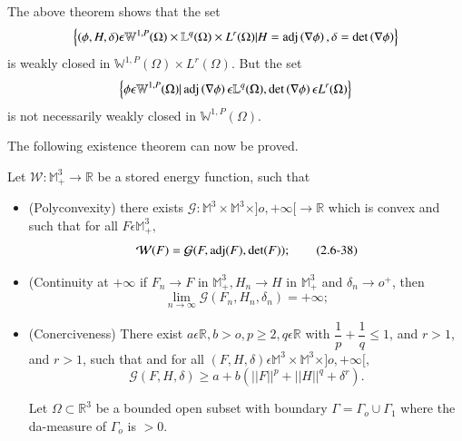 \begin{remark}\label{chap2-rem2.6.6}%
The above theorem shows that the set 
$$
\left\{(\phi,H,\delta)\epsilon \mathbb{W}^{1,P}(\Omega) \times
\mathbb{L}^q(\Omega)\times L^r(\Omega)|H = \operatorname{adj} \left(\nabla
\phi\right),\delta =\det \left(\nabla \phi\right)\right\} 
$$
is weakly closed in $\mathbb{W}^{1,P}(\Omega) \times L^r(\Omega)$. But
the set 
$$
\left\{\phi \epsilon \mathbb{W}^{1,P}(\Omega)| \operatorname{adj} \left(\nabla
\phi\right)\epsilon \mathbb{L}^q(\Omega),\det \left(\nabla
\phi\right)\epsilon L^r(\Omega)\right\} 
$$
is not necessarily weakly closed in $\mathbb{W}^{1,P}(\Omega)$.
\end{remark}

The following existence theorem can now be proved.

\begin{theorem}[J. BALL] %
 Let $\mathcal{W}: \mathbb{M}^3_+ \to \mathbb{R}$ be a
  stored energy function, such that 
\begin{itemize}
\item[(i)] (Polyconvexity) there exists $\mathcal{G}: \mathbb{M}^3 \times
\mathbb{M}^3 \times ]o, +\infty[\to \mathbb{R}$ which is convex and
    such that for all $F \epsilon \mathbb{M}^3_+,$ 
    \begin{equation*}
      \mathcal{W}(F)=\mathcal{G}(F, \operatorname{adj}
    (F),\det(F)); \tag{2.6-38}\label{eq2.6-38} 
    \end{equation*}

\item[(ii)] (Continuity at $+\infty$ if $F_n \to F$ in $\mathbb{M}^3_+, H_n
\to H$ in $\mathbb{M}^3_+$ and $\delta_n \to o^+$, then  
\begin{equation*}
\lim_{n \to \infty}\mathcal{G}(F_n,
    H_n,\delta_n)=+\infty; \tag{2.6-39}\label{eq2.6-39} 
\end{equation*}\pageoriginale


\item[(iii)] (Conerciveness) There exist $a \epsilon \mathbb{R}, b>o, p\ge
2, q \epsilon \mathbb{R}$ with $\dfrac{1}{p}+\dfrac{1}{q}\le 1$,
and $r >1$, and $r>1$, such that and for all $(F,H,\delta)\epsilon
\mathbb{M}^3 \times \mathbb{M}^3 \times]o,+\infty[,$ 
\begin{equation*}
\mathcal{G}(F,H,\delta) \ge a +b(||
F||^p+||H||^q+\delta^r). \tag{2.6-40}\label{eq2.6-40} 
\end{equation*}

Let $\Omega \subset \mathbb{R}^3$ be a bounded open subset with
boundary $\Gamma = \Gamma_o \cup \Gamma_1$ where the da-measure of
$\Gamma_o$ is $>0$. 


\end{itemize}
\end{theorem}
